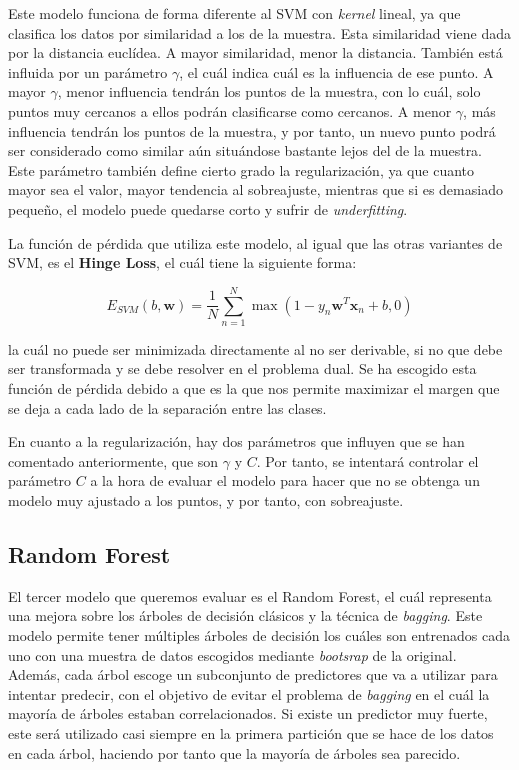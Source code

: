 \documentclass[11pt,a4paper]{article}
\begin{document}
Este modelo funciona de forma diferente al SVM con \textit{kernel} lineal, ya que clasifica los datos por similaridad a los de la muestra.
Esta similaridad viene dada por la distancia euclídea. A mayor similaridad, menor la distancia. También está influida por un parámetro
$\gamma$, el cuál indica cuál es la influencia de ese punto. A mayor $\gamma$, menor influencia tendrán los puntos de la muestra, con lo cuál,
solo puntos muy cercanos a ellos podrán clasificarse como cercanos. A menor $\gamma$, más influencia tendrán los puntos de la muestra, y por
tanto, un nuevo punto podrá ser considerado como similar aún situándose bastante lejos del de la muestra. Este parámetro también define
cierto grado la regularización, ya que cuanto mayor sea el valor, mayor tendencia al sobreajuste, mientras que si es demasiado pequeño,
el modelo puede quedarse corto y sufrir de \textit{underfitting}.

La función de pérdida que utiliza este modelo, al igual que las otras variantes de SVM, es el \textbf{Hinge Loss}, el cuál tiene la siguiente
forma:

\begin{equation}
\label{eq:hinge-loss}
E_{SVM}(b, \mathbf{w}) = \frac{1}{N} \sum_{n=1}^N \max(1 - y_n \mathbf{w}^T\mathbf{x}_n + b , 0)
\end{equation}

\noindent la cuál no puede ser minimizada directamente al no ser derivable, si no que debe ser transformada y se debe resolver en el problema
dual. Se ha escogido esta función de pérdida debido a que es la que nos permite maximizar el margen que se deja a cada lado de la separación
entre las clases.

En cuanto a la regularización, hay dos parámetros que influyen que se han comentado anteriormente, que son $\gamma$ y $C$. Por tanto, se
intentará controlar el parámetro $C$ a la hora de evaluar el modelo para hacer que no se obtenga un modelo muy ajustado a los puntos, y por
tanto, con sobreajuste.

\subsection{Random Forest}

El tercer modelo que queremos evaluar es el Random Forest, el cuál representa una mejora sobre los árboles de decisión clásicos y la técnica
de \textit{bagging}. Este modelo permite tener múltiples árboles de decisión los cuáles son entrenados cada uno con una muestra de datos
escogidos mediante \textit{bootsrap} de la original. Además, cada árbol escoge un subconjunto de predictores que va a utilizar para intentar
predecir, con el objetivo de evitar el problema de \textit{bagging} en el cuál la mayoría de árboles estaban correlacionados. Si
existe un predictor muy fuerte, este será utilizado casi siempre en la primera partición que se hace de los datos en cada árbol, haciendo por
tanto que la mayoría de árboles sea parecido.
\end{document}
